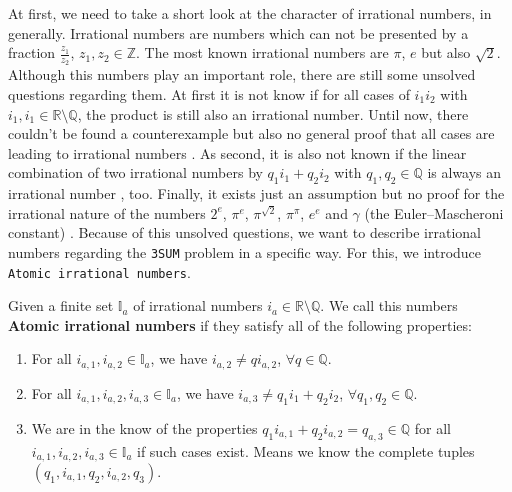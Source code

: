 At first, we need to take a short look at the character of irrational numbers, in generally. Irrational numbers are numbers which can not be presented by a fraction $\frac{z_{1}}{z_{2}}$, $z_{1}, z_{2} \in \mathbb{Z}$. The most known irrational numbers are $\pi$, $e$ but also $\sqrt{2}$. Although this numbers play an important role, there are still some unsolved questions regarding them. At first it is not know if for all cases of $i_{1}i_{2}$ with $i_{1}, i_{1} \in \mathbb{R} \setminus \mathbb{Q}$, the product is still also an irrational number. Until now, there couldn't be found a counterexample but also no general proof that all cases are leading to irrational numbers \cite{Irration5:online}. As second, it is also not known if the linear combination of two irrational numbers by $q_{1} i_{1} + q_{2} i_{2}$ with $q_{1}, q_{2} \in \mathbb{Q}$ is always an irrational number \cite{Irration5:online} \cite{PifromWo5:online}, too. Finally, it exists just an assumption but no proof for the irrational nature of the numbers $2^{e}$, $\pi^{e}$, $\pi^{\sqrt{2}}$, $\pi^{\pi}$, $e^{e}$ and $\gamma$ (the Euler–Mascheroni constant) \cite{Irration5:online}. Because of this unsolved questions, we want to describe irrational numbers regarding the \texttt{3SUM} problem in a specific way. For this, we introduce \texttt{Atomic irrational numbers}.

\begin{definition}
    Given a finite set $\mathbb{I}_{a}$ of irrational numbers $i_{a} \in \mathbb{R} \setminus \mathbb{Q}$. We call this numbers \textbf{Atomic irrational numbers} if they satisfy all of the following properties:

    \begin{enumerate}
        \item For all $i_{a,1}, i_{a,2} \in \mathbb{I}_{a}$, we have $i_{a,2} \neq q i_{a,2}$, $\forall q \in \mathbb{Q}$.
        \item For all $i_{a,1}, i_{a,2}, i_{a,3} \in \mathbb{I}_{a}$, we have $i_{a,3} \neq q_{1} i_{1} + q_{2} i_{2}$, $\forall q_{1}, q_{2} \in \mathbb{Q}$.
        \item We are in the know of the properties $q_{1} i_{a,1} + q_{2} i_{a,2} = q_{a,3} \in \mathbb{Q}$ for all $i_{a,1}, i_{a,2}, i_{a,3} \in \mathbb{I}_{a}$ if such cases exist. Means we know the complete tuples $\left(q_{1}, i_{a,1}, q_{2}, i_{a,2}, q_{3}\right)$.
    \label{enum:atomicrirationalnumbers}
    \end{enumerate}

\label{def:atomicirrationalnumbers}
\end{definition}


